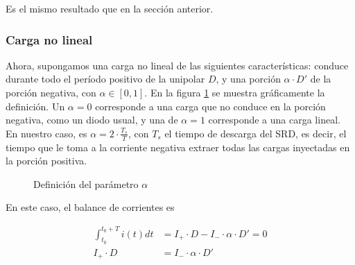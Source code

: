 Es el mismo resultado que en la sección anterior.

\subsubsection{Carga no lineal}

Ahora, supongamos una carga no lineal de las siguientes características: conduce
durante todo el período positivo de la unipolar $D$, y una porción $\alpha \cdot
D'$ de la porción negativa, con $\alpha \in \left[0, 1 \right]$. En la figura
\ref{fig:alpha_definition_plot} se muestra gráficamente la definición. Un
$\alpha=0$ corresponde a una carga que no conduce en la porción negativa, como
un diodo usual, y una de $\alpha=1$ corresponde a una carga lineal. En nuestro
caso, es $\alpha = 2 \cdot \frac{T_s}{T}$, con $T_s$ el tiempo de descarga del
SRD, es decir, el tiempo que le toma  a la corriente negativa extraer todas las
cargas inyectadas en la porción positiva.

\begin{figure}[h!]
    \begin{center}
    \end{center}
    \caption{Definición del parámetro $\alpha$}
    \label{fig:alpha_definition_plot}
\end{figure}
En este caso, el balance de corrientes es

\begin{equation}
    \label{eq:current_balance_capacitor_linear_load}
    \begin{aligned}
        \int_{t_0}^{t_0+T} i(t)dt &= I_+ \cdot D - I_- \cdot \alpha \cdot D' = 0 \\
        I_+ \cdot D &= I_- \cdot \alpha \cdot D' \\
    \end{aligned}
\end{equation}

